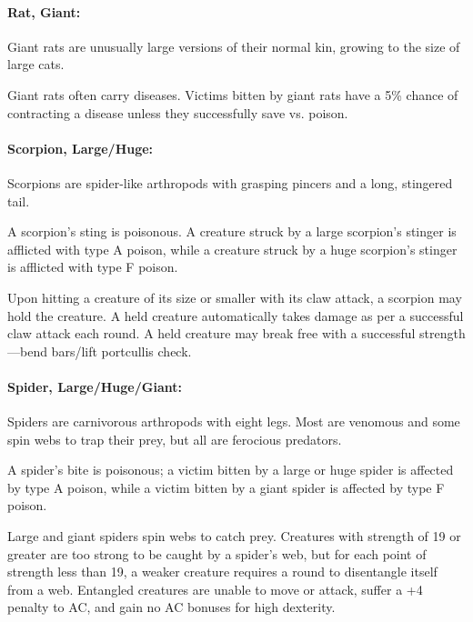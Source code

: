 \begin{multicols}{2}

\paragraph{Rat, Giant:} Giant rats are unusually large versions of their normal kin, growing to the size of large cats. 

Giant rats often carry diseases. Victims bitten by giant rats have a 5\% chance of contracting a disease unless they successfully save vs. poison.

\paragraph{Scorpion, Large/Huge:} Scorpions are spider-like arthropods with grasping pincers and a long, stingered tail.

A scorpion's sting is poisonous. A creature struck by a large scorpion's stinger is afflicted with type A poison, while a creature struck by a huge scorpion's stinger is afflicted with type F poison.

Upon hitting a creature of its size or smaller with its claw attack, a scorpion may hold the creature. A held creature automatically takes damage as per a successful claw attack each round. A held creature may break free with a successful strength---bend bars/lift portcullis check.

\paragraph{Spider, Large/Huge/Giant:} Spiders are carnivorous arthropods with eight legs. Most are venomous and some spin webs to trap their prey, but all are ferocious predators.

A spider's bite is poisonous; a victim bitten by a large or huge spider is affected by type A poison, while a victim bitten by a giant spider is affected by type F poison. 

Large and giant spiders spin webs to catch prey. Creatures with strength of 19 or greater are too strong to be caught by a spider's web, but for each point of strength less than 19, a weaker creature requires a round to disentangle itself from a web. Entangled creatures are unable to move or attack, suffer a +4 penalty to AC, and gain no AC bonuses for high dexterity.


\end{multicols}
